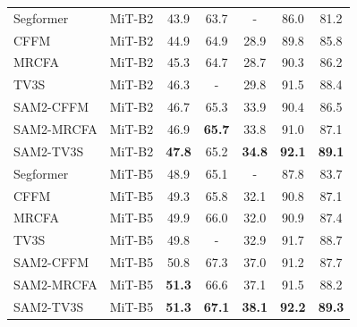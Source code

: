 \documentclass[11pt]{article}
\begin{document}
\begin{table}[htbp]
{\begin{tabular}{l|c|c|c|c|c|c}
    Segformer    & MiT-B2        & 43.9           & 63.7  & -& 86.0 & 81.2 \\
    CFFM                     & MiT-B2        & 44.9           & 64.9  & 28.9& 89.8 & 85.8 \\
    MRCFA                   & MiT-B2        & 45.3           & 64.7  & 28.7& 90.3 & 86.2 \\
    TV3S  & MiT-B2        & 46.3  & -     & 29.8& 91.5 & 88.4\\ 
    SAM2-CFFM& MiT-B2        & 46.7& 65.3& 33.9& 90.4& 86.5\\
    SAM2-MRCFA& MiT-B2        & 46.9& \textbf{65.7}& 33.8& 91.0& 87.1\\
    SAM2-TV3S& MiT-B2        & \textbf{47.8}& 65.2& \textbf{34.8}& \textbf{92.1}& \textbf{89.1}\\
    \midrule
    Segformer  & MiT-B5 & 48.9  & 65.1  & -& 87.8 & 83.7 \\
    CFFM  & MiT-B5 & 49.3  & 65.8  & 32.1& 90.8 & 87.1 \\
    MRCFA  & MiT-B5 & 49.9  & 66.0  & 32.0& 90.9 & 87.4 \\
    TV3S  & MiT-B5 & 49.8  & -  & 32.9& 91.7 & 88.7 \\ 
    SAM2-CFFM& MiT-B5        & 50.8& 67.3& 37.0& 91.2& 87.7\\
    SAM2-MRCFA& MiT-B5        & \textbf{51.3}& 66.6& 37.1& 91.5& 88.2\\
    SAM2-TV3S & MiT-B5        & \textbf{51.3}& \textbf{67.1}& \textbf{38.1}& \textbf{92.2}& \textbf{89.3}\\
    \bottomrule
  \end{tabular}
}
\end{table}
\end{document}
